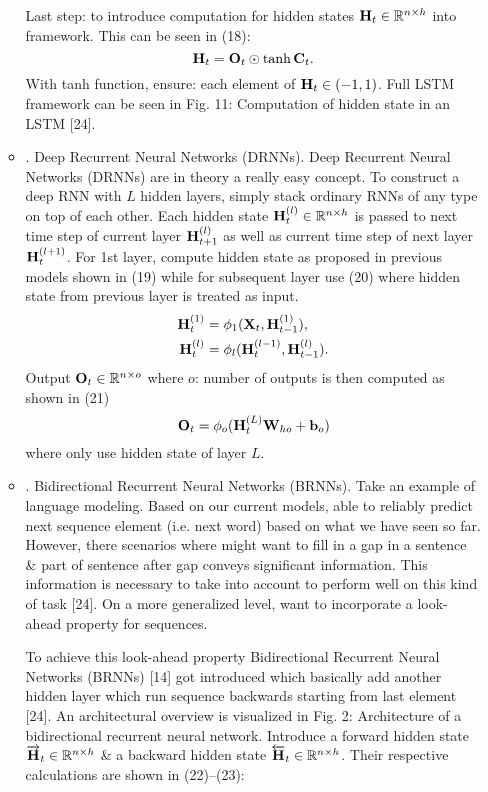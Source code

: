 \documentclass{article}
\begin{document}
\begin{enumerate}
\begin{itemize}
		Last step: to introduce computation for hidden states ${\bf H}_t\in\mathbb{R}^{n\times h}$ into framework. This can be seen in (18):
		\begin{equation}
			{\bf H}_t = {\bf O}_t\odot\tanh{\bf C}_t.
		\end{equation}
		With tanh function, ensure: each element of ${\bf H}_t\in(-1,1)$. Full LSTM framework can be seen in {\sf Fig. 11: Computation of hidden state in an LSTM [24]}.
		\item {. Deep Recurrent Neural Networks (DRNNs).} Deep Recurrent Neural Networks (DRNNs) are in theory a really easy concept. To construct a deep RNN with $L$ hidden layers, simply stack ordinary RNNs of any type on top of each other. Each hidden state ${\bf H}_t^{(l)}\in\mathbb{R}^{n\times h}$ is passed to next time step of current layer ${\bf H}_{t+1}^{(l)}$ as well as current time step of next layer ${\bf H}_t^{(l+1)}$. For 1st layer, compute hidden state as proposed in previous models shown in (19) while for subsequent layer use (20) where hidden state from previous layer is treated as input.
		\begin{align}
			{\bf H}_t^{(1)} &= \phi_1({\bf X}_t,{\bf H}_{t-1}^{(1)}),\\
			{\bf H}_t^{(l)} &= \phi_l({\bf H}_t^{(l-1)},{\bf H}_{t-1}^{(l)}).
		\end{align}
		Output ${\bf O}_t\in\mathbb{R}^{n\times o}$ where $o$: number of outputs is then computed as shown in (21)
		\begin{equation}
			{\bf O}_t = \phi_o({\bf H}_t^{(L)}{\bf W}_{ho} + {\bf b}_o)
		\end{equation}
		where only use hidden state of layer $L$.
		\item {. Bidirectional Recurrent Neural Networks (BRNNs).} Take an example of language modeling. Based on our current models, able to reliably predict next sequence element (i.e. next word) based on what we have seen so far. However, there scenarios where might want to fill in a gap in a sentence \& part of sentence after gap conveys significant information. This information is necessary to take into account to perform well on this kind of task [24]. On a more generalized level, want to incorporate a look-ahead property for sequences.
		
		To achieve this look-ahead property Bidirectional Recurrent Neural Networks (BRNNs) [14] got introduced which basically add another hidden layer which run sequence backwards starting from last element [24]. An architectural overview is visualized in {\sf Fig. 2: Architecture of a bidirectional recurrent neural network}. Introduce a forward hidden state $\overrightarrow{\bf H}_t\in\mathbb{R}^{n\times h}$ \& a backward hidden state $\overleftarrow{\bf H}_t\in\mathbb{R}^{n\times h}$. Their respective calculations are shown in (22)--(23): {}
		

\end{itemize}
\end{enumerate}
\end{document}
